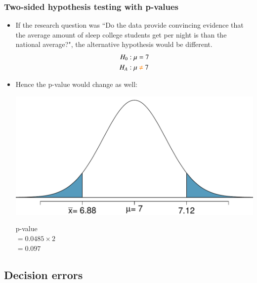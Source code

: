 \begin{frame}
\frametitle{Two-sided hypothesis testing with p-values}

\begin{itemize}

\item If the research question was ``Do the data provide convincing evidence that the average amount of sleep college students get per night is  than the national average?", the alternative hypothesis would be different.
\begin{align*}
H_0&: \mu = 7 \\
H_A&: \mu \textit{\textcolor{orange}{~$\ne$~}} 7
\end{align*}

\pause

\item Hence the p-value would change as well:
{
\begin{center}
\includegraphics[width=\textwidth]{4-3_hyp_test/figures/sleep/sleep_pval_ts}
\end{center}
}
{
p-value \\
$= 0.0485 \times 2$ \\
$= 0.097$
}

\end{itemize}

\end{frame}


\subsection{Decision errors}


